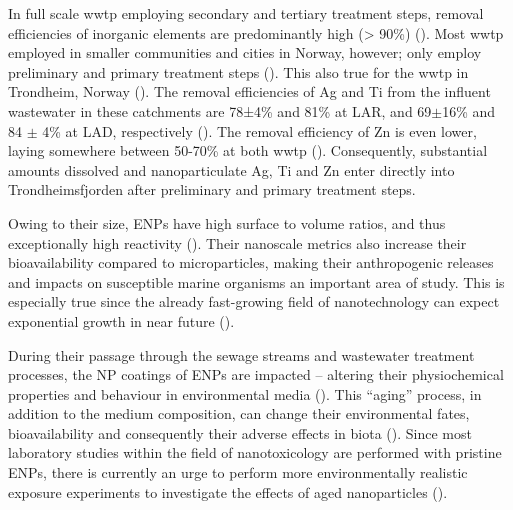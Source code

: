 In full scale \acrshort{wwtp} employing secondary and tertiary treatment steps, removal efficiencies of inorganic elements are predominantly high (> 90\%) (\cite{Cantinho2016}). Most \acrshort{wwtp} employed in smaller communities and cities in Norway, however; only employ preliminary and primary treatment steps (\cite{Berge2018}). This also true for the \acrshort{wwtp} in Trondheim, Norway (\cite{Farkas2020}). The removal efficiencies of \acrshort{Ag} and Ti from the influent wastewater in these catchments are 78±4\% and 81\% at LAR, and 69$\pm$16\% and 84 $\pm$ 4\% at LAD, respectively (\cite{Polesel2018}). The removal efficiency of Zn is even lower, laying somewhere between 50-70\% at both \acrshort{wwtp} (\cite{Farkas2020}). Consequently, substantial amounts dissolved and nanoparticulate \acrshort{Ag}, Ti and Zn enter directly into Trondheimsfjorden after preliminary and primary treatment steps. 

Owing to their size, \acrshort{ENPs} have high surface to volume ratios, and thus exceptionally high reactivity (\cite{Warheit2018}). Their nanoscale metrics also increase their bioavailability compared to microparticles, making their anthropogenic releases and impacts on susceptible marine organisms an important area of study. This is especially true since the already fast-growing field of nanotechnology can expect exponential growth in near future (\cite{Talebian2021}). 

During their passage through the sewage streams and wastewater treatment processes, the NP coatings of \acrshort{ENPs} are impacted – altering their physiochemical properties and behaviour in environmental media (\cite{Kaegi2013}). This “aging” process, in addition to the medium composition, can change their environmental fates, bioavailability and consequently their adverse effects in biota (\cite{Metreveli2016, Georgantzopoulou2020}). Since most laboratory studies within the field of nanotoxicology are performed with pristine \acrshort{ENPs}, there is currently an urge to perform more environmentally realistic exposure experiments to investigate the effects of aged nanoparticles (\cite{Metreveli2016}).

